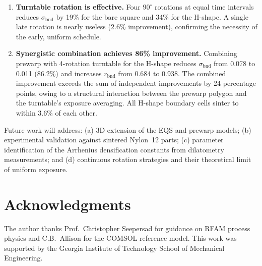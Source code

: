 \documentclass[10pt,twocolumn]{article}
\newcommand{\bndstd}{\sigma_{\mathrm{bnd}}}
\begin{document}
\begin{enumerate}
\item \textbf{Turntable rotation is effective.}  Four $90^\circ$
      rotations at equal time intervals reduces $\bndstd$ by 19\% for
      the bare square and 34\% for the H-shape.  A single late rotation
      is nearly useless (2.6\% improvement), confirming the necessity
      of the early, uniform schedule.

\item \textbf{Synergistic combination achieves 86\% improvement.}
      Combining prewarp with 4-rotation turntable for the H-shape
      reduces $\bndstd$ from 0.078 to 0.011 (86.2\%) and increases
      $r_{\mathrm{bnd}}$ from 0.684 to 0.938.  The combined improvement
      exceeds the sum of independent improvements by 24 percentage
      points, owing to a structural interaction between the prewarp
      polygon and the turntable's exposure averaging.  All H-shape
      boundary cells sinter to within 3.6\% of each other.

\end{enumerate}

Future work will address: (a) 3D extension of the EQS and prewarp
models; (b) experimental validation against sintered Nylon~12 parts;
(c) parameter identification of the Arrhenius densification constants
from dilatometry measurements; and (d) continuous rotation strategies
and their theoretical limit of uniform exposure.

\section*{Acknowledgments}

The author thanks Prof.\ Christopher Seepersad for guidance on RFAM
process physics and C.B.\ Allison for the COMSOL reference model.
This work was supported by the Georgia Institute of Technology School
of Mechanical Engineering.
\end{document}
